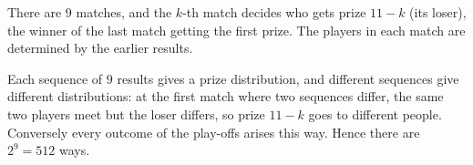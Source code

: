 There are $9$ matches, and the $k$-th match decides who gets prize $11-k$ (its loser), the winner of the last match getting the first prize. The players in each match are determined by the earlier results.

Each sequence of $9$ results gives a prize distribution, and different sequences give different distributions: at the first match where two sequences differ, the same two players meet but the loser differs, so prize $11-k$ goes to different people. Conversely every outcome of the play-offs arises this way. Hence there are $2^9=\boxed{512}$ ways.
